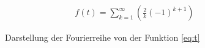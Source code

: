     \begin{align}
        f(t)= \sum_{k=1}^{\infty} \left(\frac{2}{k} (-1)^{k+1}\right)
    \end{align}
    \begin{figure}[h]   %
        \centering
        \caption{Darstellung der Fourierreihe von der Funktion \eqref{eq:t}} \vspace{-1.5em}
        \label{fig:sc_t}
    \end{figure}


